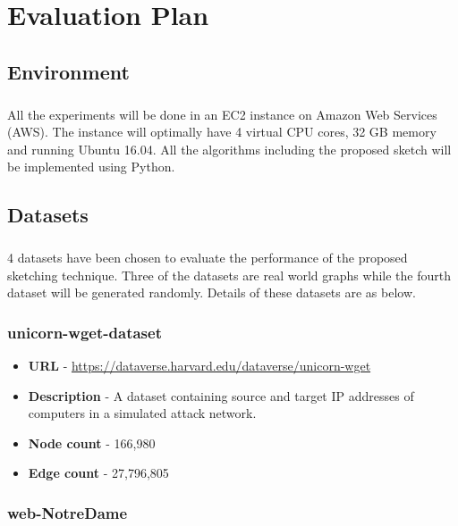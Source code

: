 \chapter{Evaluation Plan} \label{evplan}

\section{Environment}

\paragraph{}
All the experiments will be done in an EC2 instance on Amazon Web Services (AWS). The instance will optimally have 4 virtual CPU cores, 32 GB memory and running Ubuntu 16.04. All the algorithms including the proposed sketch will be implemented using Python. 

\section{Datasets}

\paragraph{}
4 datasets have been chosen to evaluate the performance of the proposed sketching technique. Three of the datasets are real world graphs while the fourth dataset will be generated randomly. Details of these datasets are as below. 

\subsection{unicorn-wget-dataset}

\begin{itemize}
    \item \textbf{URL} - \url{https://dataverse.harvard.edu/dataverse/unicorn-wget}
    \item \textbf{Description} - A dataset containing source and target IP addresses of computers in a simulated attack network.
    \item \textbf{Node count} - 166,980
    \item \textbf{Edge count} - 27,796,805
\end{itemize}

\subsection{web-NotreDame}

